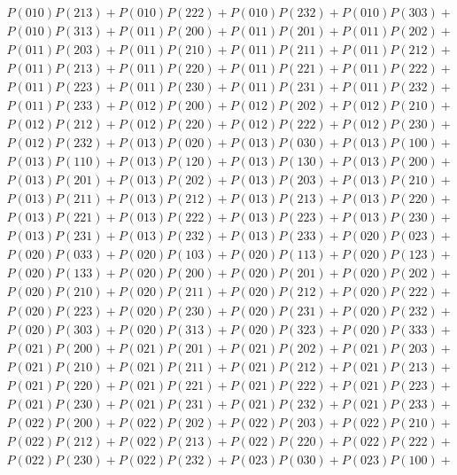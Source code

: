 \documentclass{article}
\theoremstyle{definition}
\begin{document}
\begin{gather*}
    P(010)P(213) + P(010)P(222) + P(010)P(232) + P(010)P(303) + \\
    P(010)P(313) + P(011)P(200) + P(011)P(201) + P(011)P(202) + \\
    P(011)P(203) + P(011)P(210) + P(011)P(211) + P(011)P(212) + \\
    P(011)P(213) + P(011)P(220) + P(011)P(221) + P(011)P(222) + \\
    P(011)P(223) + P(011)P(230) + P(011)P(231) + P(011)P(232) + \\
    P(011)P(233) + P(012)P(200) + P(012)P(202) + P(012)P(210) + \\
    P(012)P(212) + P(012)P(220) + P(012)P(222) + P(012)P(230) + \\
    P(012)P(232) + P(013)P(020) + P(013)P(030) + P(013)P(100) + \\
    P(013)P(110) + P(013)P(120) + P(013)P(130) + P(013)P(200) + \\
    P(013)P(201) + P(013)P(202) + P(013)P(203) + P(013)P(210) + \\
    P(013)P(211) + P(013)P(212) + P(013)P(213) + P(013)P(220) + \\
    P(013)P(221) + P(013)P(222) + P(013)P(223) + P(013)P(230) + \\
    P(013)P(231) + P(013)P(232) + P(013)P(233) + P(020)P(023) + \\
    P(020)P(033) + P(020)P(103) + P(020)P(113) + P(020)P(123) + \\
    P(020)P(133) + P(020)P(200) + P(020)P(201) + P(020)P(202) + \\
    P(020)P(210) + P(020)P(211) + P(020)P(212) + P(020)P(222) + \\
    P(020)P(223) + P(020)P(230) + P(020)P(231) + P(020)P(232) + \\
    P(020)P(303) + P(020)P(313) + P(020)P(323) + P(020)P(333) + \\
    P(021)P(200) + P(021)P(201) + P(021)P(202) + P(021)P(203) + \\
    P(021)P(210) + P(021)P(211) + P(021)P(212) + P(021)P(213) + \\
    P(021)P(220) + P(021)P(221) + P(021)P(222) + P(021)P(223) + \\
    P(021)P(230) + P(021)P(231) + P(021)P(232) + P(021)P(233) + \\
    P(022)P(200) + P(022)P(202) + P(022)P(203) + P(022)P(210) + \\
    P(022)P(212) + P(022)P(213) + P(022)P(220) + P(022)P(222) + \\
    P(022)P(230) + P(022)P(232) + P(023)P(030) + P(023)P(100) + \\

\end{gather*}
\end{document}
